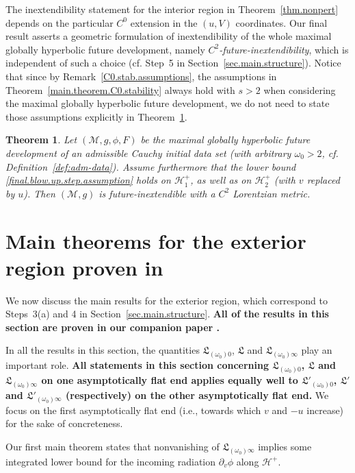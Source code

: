\documentclass[10pt, reqno]{amsart}
\newtheorem{theorem}{Theorem}[section]
\theoremstyle{definition}
\theoremstyle{remark}
\numberwithin{equation}{section}
\newcommand{\rd}{\partial}
\newcommand{\0}{\emptyset}
\newcommand{\omg}{\omega}
\newcommand{\calH}{\mathcal H}
\newcommand{\calM}{\mathcal M}
\newcommand{\EH}{\calH^{+}}
\begin{document}
The inextendibility statement for the interior region in Theorem~\ref{thm.nonpert} depends on the particular $C^{0}$ extension in the $(u, V)$ coordinates. Our final result asserts a geometric formulation of inextendibility of the whole maximal globally hyperbolic future development, namely \emph{$C^{2}$-future-inextendibility}, which is independent of such a choice (cf. Step~5 in Section~\ref{sec.main.structure}). Notice that since by Remark~\ref{C0.stab.assumptions}, the assumptions in Theorem~\ref{main.theorem.C0.stability} always hold with $s>2$ when considering the maximal globally hyperbolic future development, we do not need to state those assumptions explicitly in Theorem~\ref{main.theorem.C2}.
\begin{theorem}\label{main.theorem.C2}
Let $(\calM, g, \phi, F)$ be the maximal globally hyperbolic future development of an admissible Cauchy initial data set (with arbitrary $\omg_{0} > 2$, cf. Definition~\ref{def:adm-data}). Assume furthermore that the lower bound \eqref{final.blow.up.step.assumption} holds on $\EH_{1}$, as well as on $\EH_{2}$ (with $v$ replaced by $u$).
Then $(\calM, g)$ is future-inextendible with a $C^2$ Lorentzian metric.
\end{theorem}

\section{Main theorems for the exterior region proven in \cite{LO.exterior}}  \label{sec:main-thm}

We now discuss the main results for the exterior region, which correspond to Steps~3(a) and 4 in Section~\ref{sec.main.structure}. \textbf{All of the results in this section are proven in our companion paper \cite{LO.exterior}.}


In all the results in this section, the quantities $\mathfrak{L}_{(\omg_{0}) 0}$, $\mathfrak{L}$ and $\mathfrak{L}_{(\omg_{0}) \infty}$ play an important role. \textbf{All statements in this section concerning $\mathfrak{L}_{(\omg_{0}) 0}$, $\mathfrak{L}$ and $\mathfrak{L}_{(\omg_{0}) \infty}$ on one asymptotically flat end applies equally well to $\mathfrak{L}'_{(\omg_{0}) 0}$, $\mathfrak{L}'$ and $\mathfrak{L}'_{(\omg_{0}) \infty}$ (respectively) on the other asymptotically flat end.} We focus on the first asymptotically flat end (i.e., towards which $v$ and $-u$ increase) for the sake of concreteness.

Our first main theorem states that nonvanishing of $\mathfrak{L}_{(\omg_{0}) \infty}$ implies some integrated lower bound for the incoming radiation $\rd_{v} \phi$ along $\EH$. 
\end{document}
